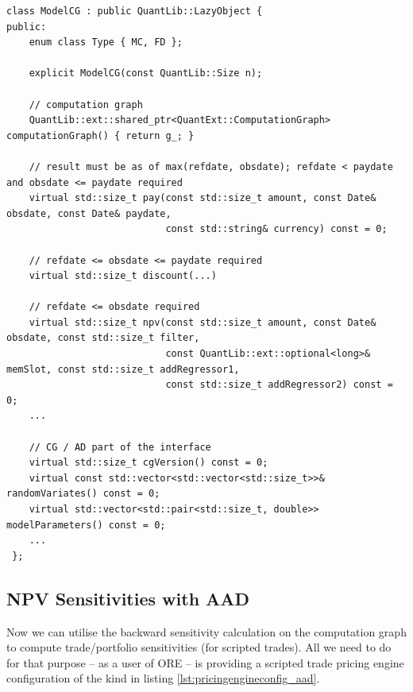 \begin{listing}
\begin{verbatim}
class ModelCG : public QuantLib::LazyObject {
public:
    enum class Type { MC, FD };

    explicit ModelCG(const QuantLib::Size n);

    // computation graph
    QuantLib::ext::shared_ptr<QuantExt::ComputationGraph> computationGraph() { return g_; }

    // result must be as of max(refdate, obsdate); refdate < paydate and obsdate <= paydate required
    virtual std::size_t pay(const std::size_t amount, const Date& obsdate, const Date& paydate,
                            const std::string& currency) const = 0;

    // refdate <= obsdate <= paydate required
    virtual std::size_t discount(...)

    // refdate <= obsdate required
    virtual std::size_t npv(const std::size_t amount, const Date& obsdate, const std::size_t filter,
                            const QuantLib::ext::optional<long>& memSlot, const std::size_t addRegressor1,
                            const std::size_t addRegressor2) const = 0;
    ...

    // CG / AD part of the interface
    virtual std::size_t cgVersion() const = 0;
    virtual const std::vector<std::vector<std::size_t>>& randomVariates() const = 0;
    virtual std::vector<std::pair<std::size_t, double>> modelParameters() const = 0;
    ...
 };
\end{verbatim}
\caption{Scripting model base class {\tt ModelCG} using a computation graph.}
\label{lst:modelcg}
\end{listing}

\subsection{NPV Sensitivities with AAD}

Now we can utilise the backward sensitivity calculation on the computation graph to compute
trade/portfolio sensitivities (for scripted trades). All we need to do for that purpose -- as a user
of ORE -- is providing a scripted trade pricing engine configuration of the kind in listing
\ref{lst:pricingengineconfig_aad}.

